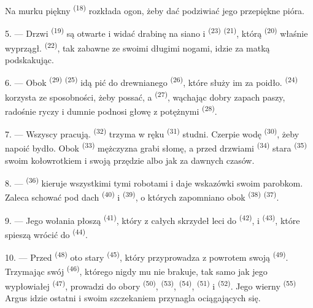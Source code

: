 Na murku piękny  \textsuperscript{(18)} rozkłada ogon, żeby dać podziwiać
jego przepiękne pióra.

\VUsaut{3.0mm}

5. --- Drzwi  \textsuperscript{(19)} są otwarte i widać drabinę na siano
i  \textsuperscript{(23)}  \textsuperscript{(21)}, którą
 \textsuperscript{(20)} właśnie wyprzągł. 
\textsuperscript{(22)}, tak zabawne ze swoimi długimi nogami, idzie za matką podskakując.

6. --- Obok  \textsuperscript{(29)}  \textsuperscript{(25)}
idą pić do drewnianego  \textsuperscript{(26)}, które służy im za
poidło.  \textsuperscript{(24)} korzysta ze sposobności, żeby possać, a
 \textsuperscript{(27)}, wąchając dobry zapach paszy, radośnie ryczy i dumnie
podnosi głowę z potężnymi  \textsuperscript{(28)}.

7. --- Wszyscy pracują.  \textsuperscript{(32)} trzyma w ręku
 \textsuperscript{(31)} studni. Czerpie wodę 
\textsuperscript{(30)}, żeby napoić bydło. Obok  \textsuperscript{(33)}
mężczyzna grabi słomę, a przed drzwiami  \textsuperscript{(34)} stara
 \textsuperscript{(35)} swoim kołowrotkiem i swoją 
przędzie  albo  jak za dawnych czasów.

\VUsaut{3.0mm}
\VUsaut{3.0mm}

8. ---  \textsuperscript{(36)} kieruje wszystkimi tymi robotami i daje
wskazówki swoim parobkom. Zaleca schować pod dach  \textsuperscript{(40)}
i  \textsuperscript{(39)}, o których zapomniano obok 
\textsuperscript{(38)}  \textsuperscript{(37)}.

9. --- Jego wołania płoszą  \textsuperscript{(41)}, który z całych
skrzydeł leci do  \textsuperscript{(42)}, i 
\textsuperscript{(43)}, które spieszą wrócić do  \textsuperscript{(44)}.

10. --- Przed  \textsuperscript{(48)} oto stary 
\textsuperscript{(45)}, który przyprowadza z powrotem swoją 
\textsuperscript{(49)}. Trzymając swój  \textsuperscript{(46)},
którego nigdy mu nie brakuje, tak samo jak jego wypłowiałej 
\textsuperscript{(47)}, prowadzi do obory  \textsuperscript{(50)},
 \textsuperscript{(53)},  \textsuperscript{(54)},
 \textsuperscript{(51)} i  \textsuperscript{(52)}. Jego
wierny  \textsuperscript{(55)} Argus idzie ostatni i swoim szczekaniem
przynagla ociągających się.

